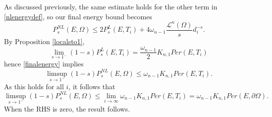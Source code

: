 \documentclass[../main.tex]{subfiles}
\begin{document}
As discussed previously, the same estimate holds for the other term in \ref{nlenergydef}, so our final energy bound becomes
\begin{equation}\label{finalenergy}
    P_{s}^{NL}(E,\Omega) \leq 2P_{s}^{L}(E,T_{i}) + 4 \omega_{n-1}\frac{\mathcal{L}^{n}(\Omega)}{s}d_{i}^{-s}.
\end{equation}
By Proposition \ref{localsto1}, 
\[
    \lim_{s\to1^{-}}(1-s)P_{s}^{L}(E,T_{i}) = \frac{\omega_{n-1}}{2}K_{n,1}Per(E,T_{i})
\]
hence \ref{finalenergy} implies
\[
    \limsup_{s\to1^{-}}(1-s)P_{s}^{NL}(E,\Omega) \leq \omega_{n-1}K_{n,1}Per(E,T_{i}).
\]
As this holds for all $ i $, it follows that 
\[
    \limsup_{s\to1^{-}}(1-s)P_{s}^{NL}(E,\Omega) \leq \lim_{i\to\infty}\omega_{n-1}K_{n,1}Per(E,T_{i}) = \omega_{n-1}K_{n,1}Per(E,\partial \Omega).
\]
When the RHS is zero, the result follows.
\end{document}
